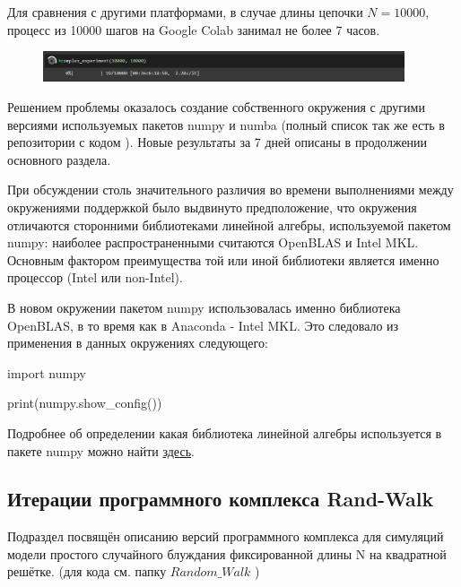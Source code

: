 Для сравнения с другими платформами, в случае длины цепочки $N=10000$, процесс из 10000 шагов на Google Colab занимал не более 7 часов.

\begin{figure}[h]
    \centering
    \includegraphics[width=0.95\textwidth]{Sections/Images_2/experiment_time.png}
\end{figure}

Решением проблемы оказалось создание собственного окружения с другими версиями используемых пакетов numpy и numba (полный список так же есть в репозитории с кодом \cite{web:ProjectMagnetRepos}). Новые результаты за 7 дней описаны в продолжении основного раздела.

При обсуждении столь значительного различия во времени выполнениями между окружениями поддержкой было выдвинуто предположение, что окружения отличаются сторонними библиотеками линейной алгебры, используемой пакетом numpy: наиболее распространенными считаются OpenBLAS и Intel MKL. Основным фактором преимущества той или иной библиотеки является именно процессор (Intel или non-Intel). 

В новом окружении пакетом numpy использовалась именно библиотека OpenBLAS, в то время как в Anaconda - Intel MKL. Это следовало из применения в данных окружениях следующего:

\begin{code}
import numpy

print(numpy.show\_config())
\end{code}

Подробнее об определении какая библиотека линейной алгебры используется в пакете numpy можно найти \href{https://shaalltime.medium.com/benchmark-numpy-with-openblas-and-mkl-library-on-amd-ryzen-3950x-cpu-96184f91057f}{здесь}. 


\subsection{Итерации программного комплекса Rand-Walk}

Подраздел посвящён описанию версий программного комплекса для симуляций модели простого случайного блуждания фиксированной длины N на квадратной решётке.
(для кода см. папку $Random\_Walk$  \cite{web:ProjectMagnetRepos})

